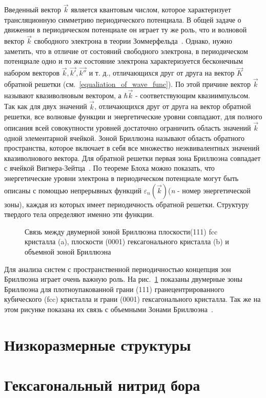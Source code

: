 Введенный вектор $\vec{k}$ является квантовым числом, которое 
характеризует трансляционную симметрию периодического потенциала. 
В общей задаче о движении в периодическом потенциале он играет ту же роль, что и волновой вектор $\vec{k}$ свободного электрона в теории 
Зоммерфельда~\cite{Kittel1976}. Однако, нужно заметить, что в отличие 
от состояний свободного электрона, в периодическом потенциале одно
и то же состояние электрона характеризуется бесконечным набором векторов
$\vec{k}, \vec{k'}, \vec{k''}$ и т. д., отличающихся друг от друга на вектор $\vec{K}$ обратной решетки (см.~\ref{equaliation_of_wave_func}).
По этой причине вектор $\vec{k}$ называют квазиволновым вектором, а
$\hbar\vec{k}$ - соответствующим квазиимпульсом. Так как для двух
значений $\vec{k}$, отличающихся друг от друга на вектор обратной 
решетки, все волновые функции и энергетические уровни совпадают,
для полного описания всей совокупности уровней достаточно ограничить
область значений $\vec{k}$ одной элементарной ячейкой.
Зоной Бриллюэна называют область обратного пространства, которое включает
в себя все множество неэквивалентных значений квазиволнового вектора.
Для обратной решетки первая зона Бриллюэна совпадает с ячейкой 
Вигнера-Зейтца~\cite{Kittel1976}. По теореме Блоха можно показать, что 
энергетические уровни электрона в периодическом потенциале могут быть описаны с помощью непрерывных функций $\varepsilon_n(\vec{k})$(\textit{n} - 
номер энергетической зоны), каждая из которых имеет периодичность
обратной решетки. Структуру твердого тела определяют именно эти 
функции\cite{Simonov_disser}.
\begin{figure}[!ht]
\caption{Связь между двумерной зоной Бриллюэна плоскости(111) fcc
кристалла (a), плоскости (0001) гексагонального кристалла (b) и 
объемной зоной Бриллюэна~\cite{Hufner2019}}
\label{pic:Brilluen_zones}
\end{figure}


Для анализа систем с пространственной периодичностью концепция
зон Бриллюэна играет очень важную роль. На рис.~\ref{pic:Brilluen_zones}
показаны двумерные зоны Бриллюэна для плотноупакованной грани (111) 
гранецентрированного кубического (fcc) кристалла и грани (0001)
гексагонального кристалла. Так же на этом рисунке показана их связь с 
объемными Зонами Бриллюэна~\cite{Hufner2019}. 





\section{Низкоразмерные структуры} \label{sect1_2}

\section{Гексагональный нитрид бора} \label{sect1_3}
